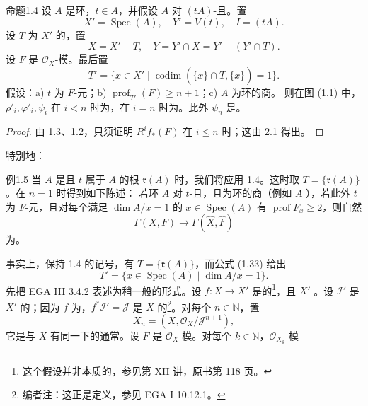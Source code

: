 \begin{SGAresult}{命题}{1.4}
设 $A$ 是环，$t\in A$，并假设 $A$ 对 $(tA)$-且。置
\[X'=\operatorname{Spec}(A),\quad Y'=V(t),\quad I=(tA).\tag{1.31}\]
设 $T$ 为 $X'$ 的，置
\[X=X'-T,\quad Y=Y'\cap X=Y'-(Y'\cap T).\tag{1.32}\]
设 $F$ 是 $\mathcal O_X$-模。最后置
\[T'=\{x\in X'\mid\operatorname{codim}(\overline{\{x\}}\cap T,\overline{\{x\}})=1\}.\tag{1.33}\]
假设：a) $t$ 为 $F$-元；b) $\operatorname{prof}_{T'}(F)\geq n+1$；c) $A$ 为环的商。
则在图 (1.1) 中， $\rho'_i,\varphi'_i,\psi_i$ 在 $i<n$ 时为，在 $i=n$ 时为。此外 $\psi_n$ 是。
\end{SGAresult}
\begin{proof}
由 1.3、1.2，只须证明 $R^if_*(F)$ 在 $i\leq n$ 时；这由 2.1 得出。
\end{proof}
特别地：
\begin{SGAresult}{例}{1.5}
当 $A$ 是且 $t$ 属于 $A$ 的根 $\mathfrak r(A)$ 时，我们将应用 1.4。这时取 $T=\{\mathfrak r(A)\}$。在 $n=1$ 时得到如下陈述：
若环 $A$ 对 $t$-且，且为环的商（例如 $A$ ），若此外 $t$ 为 $F$-元，且对每个满足 $\dim A/x=1$ 的 $x\in\operatorname{Spec}(A)$ 有 $\operatorname{prof}F_x\geq2$，则自然
\[\Gamma(X,F)\longrightarrow\Gamma(\widehat X,\widehat F)\]
为。
\end{SGAresult}
事实上，保持 1.4 的记号，有 $T=\{\mathfrak r(A)\}$，而公式 (1.33) 给出
\[T'=\{x\in\operatorname{Spec}(A)\mid\dim A/x=1\}.\]
先把 EGA III 3.4.2 表述为稍一般的形式。设 $f:X\to X'$ 是的\footnote{这个假设并非本质的，参见第 XII 讲，原书第 118 页。}，且 $X'$ 。设 $\mathcal I'$ 是 $X'$ 的；因为 $f$ 为，$f^*\mathcal I'=\mathcal J$ 是 $X$ 的\footnote{编者注：这正是定义，参见 EGA I 10.12.1。}。对每个 $n\in\mathbb N$，置
\[X_n=(X,\mathcal O_X/\mathcal J^{n+1}),\tag{2.1}\]
它是与 $X$ 有同一下的通常。设 $F$ 是 $\mathcal O_X$-模。对每个 $k\in\mathbb N$，$\mathcal O_{X_k}$-模
